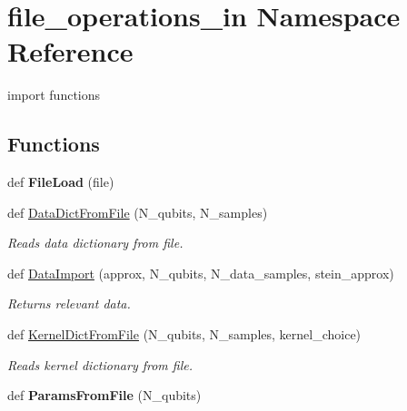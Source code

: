 \hypertarget{namespacefile__operations__in}{}\section{file\+\_\+operations\+\_\+in Namespace Reference}
\label{namespacefile__operations__in}


import functions  


\subsection*{Functions}
\begin{DoxyCompactItemize}
\item 
\mbox{\label{namespacefile__operations__in_abd93ca370d58de1cdceb31432a79d9e8}} 
def {\bfseries File\+Load} (file)
\item 
def \hyperlink{namespacefile__operations__in_a58802373d42fea906c8a8ede3cb9079d}{Data\+Dict\+From\+File} (N\+\_\+qubits, N\+\_\+samples)
\begin{DoxyCompactList}\small\item\em Reads data dictionary from file. \end{DoxyCompactList}\item 
def \hyperlink{namespacefile__operations__in_acd5f21f612a2565c5c6366eb298bfc2f}{Data\+Import} (approx, N\+\_\+qubits, N\+\_\+data\+\_\+samples, stein\+\_\+approx)
\begin{DoxyCompactList}\small\item\em Returns relevant data. \end{DoxyCompactList}\item 
\mbox{\label{namespacefile__operations__in_aad76fa33012a8b2efd1b024b9d9cfc95}} 
def \hyperlink{namespacefile__operations__in_aad76fa33012a8b2efd1b024b9d9cfc95}{Kernel\+Dict\+From\+File} (N\+\_\+qubits, N\+\_\+samples, kernel\+\_\+choice)
\begin{DoxyCompactList}\small\item\em Reads kernel dictionary from file. \end{DoxyCompactList}\item 
\mbox{\label{namespacefile__operations__in_ad937c895b97cd4fd3515fb20cc593dd8}} 
def {\bfseries Params\+From\+File} (N\+\_\+qubits)
\end{DoxyCompactItemize}



